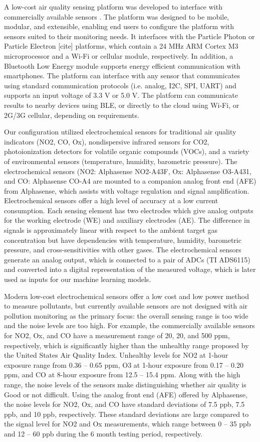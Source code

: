 \documentclass[journal abbreviation, manuscript]{copernicus}
\begin{document}
A low-cost air quality sensing platform was developed to interface with commercially available sensors \citep{Chan2017context}. The platform was designed to be mobile, modular, and extensible, enabling end users to configure the platform with sensors suited to their monitoring needs. It interfaces with the Particle Photon or Particle Electron [cite] platforms, which contain a 24 MHz ARM Cortex M3 microprocessor and a Wi-Fi or cellular module, respectively. In addition, a Bluetooth Low Energy module supports energy efficient communication with smartphones. The platform can interface with any sensor that communicates using standard communication protocols (i.e. analog, I2C, SPI, UART) and supports an input voltage of 3.3 V or 5.0 V. The platform can communicate results to nearby devices using BLE, or directly to the cloud using Wi-Fi, or 2G/3G cellular, depending on requirements.

Our configuration utilized electrochemical sensors for traditional air quality indicators (NO2, CO, Ox), nondispersive infrared sensors for CO2, photoionization detectors for volatile organic compounds (VOCs), and a variety of environmental sensors (temperature, humidity, barometric pressure). The electrochemical sensors (NO2: Alphasense NO2-A43F, Ox: Alphasense O3-A431, and CO: Alphasense CO-A4 are mounted to a companion analog front end (AFE) from Alphasense, which assists with voltage regulation and signal amplification. Electrochemical sensors offer a high level of accuracy at a low current consumption. Each sensing element has two electrodes which give analog outputs for the working electrode (WE) and auxiliary electrodes (AE). The difference in signals is approximately linear with respect to the ambient target gas concentration but have dependencies with temperature, humidity, barometric pressure, and cross-sensitivities with other gases. The electrochemical sensors generate an analog output, which is connected to a pair of ADCs (TI ADS6115) and converted into a digital representation of the measured voltage, which is later used as inputs for our machine learning models.

Modern low-cost electrochemical sensors offer a low cost and low power method to measure pollutants, but currently available sensors are not designed with air pollution monitoring as the primary focus: the overall sensing range is too wide and the noise levels are too high. For example, the commercially available sensors for NO2, Ox, and CO have a measurement range of 20, 20, and 500 ppm, respectively, which is significantly higher than the unhealthy range proposed by the United States Air Quality Index. Unhealthy levels for NO2 at 1-hour exposure range from 0.36 – 0.65 ppm, O3 at 1-hour exposure from 0.17 – 0.20 ppm, and CO at 8-hour exposure from 12.5 – 15.4 ppm. Along with the high range, the noise levels of the sensors make distinguishing whether air quality is Good or not difficult. Using the analog front end (AFE) offered by Alphasense, the noise levels for NO2, Ox, and CO have standard deviations of 7.5 ppb, 7.5 ppb, and 10 ppb, respectively. These standard deviations are large compared to the signal level for NO2 and Ox measurements, which range between 0 – 35 ppb and 12 – 60 ppb during the 6 month testing period, respectively.
\end{document}
